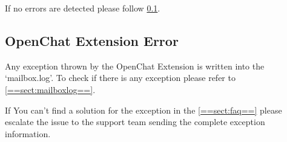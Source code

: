 If no errors are detected please follow \ref{==sect:ext-err==}.

\subsection[Extension Error]{OpenChat Extension Error}
\label{==sect:ext-err==}
Any exception thrown by the OpenChat Extension is written into the `mailbox.log'. To check if there is any exception please
refer to \ref{==sect:mailboxlog==}.

If You can't find a solution for the exception in the \ref{==sect:faq==} please escalate the issue to the support team
sending the complete exception information\footnotemark[1].


